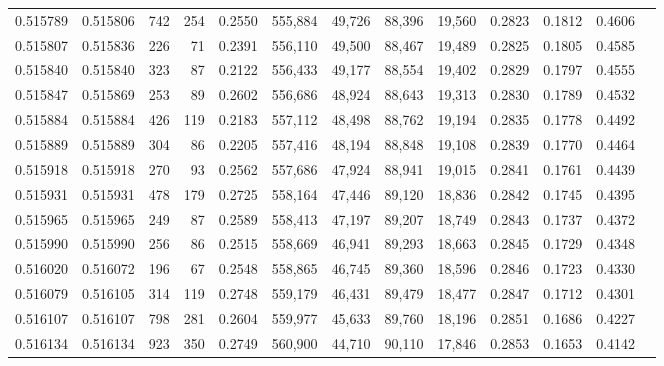 \begin{tabular}{rrrrrrrrrrrrr}
0.515789 & 0.515806 &   742 &   254 &                                     0.2550 & 555,884 &  49,726 &  88,396 &  19,560 & 0.2823 & 0.1812 & 0.4606 \\
0.515807 & 0.515836 &   226 &    71 &                                     0.2391 & 556,110 &  49,500 &  88,467 &  19,489 & 0.2825 & 0.1805 & 0.4585 \\
0.515840 & 0.515840 &   323 &    87 &                                     0.2122 & 556,433 &  49,177 &  88,554 &  19,402 & 0.2829 & 0.1797 & 0.4555 \\
0.515847 & 0.515869 &   253 &    89 &                                     0.2602 & 556,686 &  48,924 &  88,643 &  19,313 & 0.2830 & 0.1789 & 0.4532 \\
0.515884 & 0.515884 &   426 &   119 &                                     0.2183 & 557,112 &  48,498 &  88,762 &  19,194 & 0.2835 & 0.1778 & 0.4492 \\
0.515889 & 0.515889 &   304 &    86 &                                     0.2205 & 557,416 &  48,194 &  88,848 &  19,108 & 0.2839 & 0.1770 & 0.4464 \\
0.515918 & 0.515918 &   270 &    93 &                                     0.2562 & 557,686 &  47,924 &  88,941 &  19,015 & 0.2841 & 0.1761 & 0.4439 \\
0.515931 & 0.515931 &   478 &   179 &                                     0.2725 & 558,164 &  47,446 &  89,120 &  18,836 & 0.2842 & 0.1745 & 0.4395 \\
0.515965 & 0.515965 &   249 &    87 &                                     0.2589 & 558,413 &  47,197 &  89,207 &  18,749 & 0.2843 & 0.1737 & 0.4372 \\
0.515990 & 0.515990 &   256 &    86 &                                     0.2515 & 558,669 &  46,941 &  89,293 &  18,663 & 0.2845 & 0.1729 & 0.4348 \\
0.516020 & 0.516072 &   196 &    67 &                                     0.2548 & 558,865 &  46,745 &  89,360 &  18,596 & 0.2846 & 0.1723 & 0.4330 \\
0.516079 & 0.516105 &   314 &   119 &                                     0.2748 & 559,179 &  46,431 &  89,479 &  18,477 & 0.2847 & 0.1712 & 0.4301 \\
0.516107 & 0.516107 &   798 &   281 &                                     0.2604 & 559,977 &  45,633 &  89,760 &  18,196 & 0.2851 & 0.1686 & 0.4227 \\
0.516134 & 0.516134 &   923 &   350 &                                     0.2749 & 560,900 &  44,710 &  90,110 &  17,846 & 0.2853 & 0.1653 & 0.4142 \\

\end{tabular}
